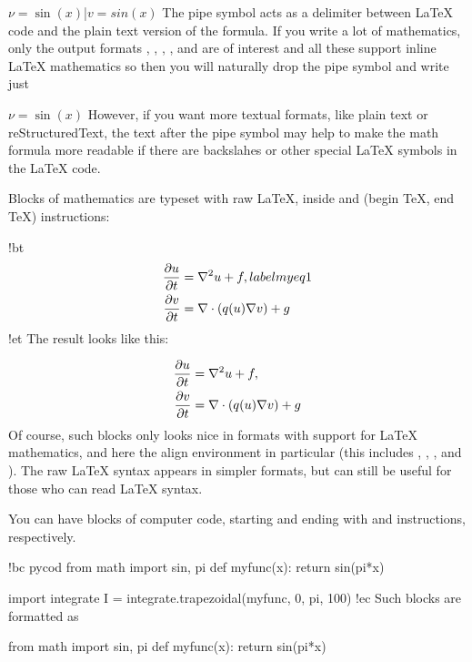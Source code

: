 \documentclass[%
oneside,                 %
final,                   %
10pt]{article}
\begin{document}
\bccq
$\nu = \sin(x)$|$v = sin(x)$
\eccq
The pipe symbol acts as a delimiter between {\LaTeX} code and the plain text
version of the formula. If you write a lot of mathematics, only the
output formats , , , , and 
are of interest
and all these support inline {\LaTeX} mathematics so then you will naturally
drop the pipe symbol and write just

\bccq
$\nu = \sin(x)$
\eccq
However, if you want more textual formats, like plain text or reStructuredText,
the text after the pipe symbol may help to make the math formula more readable
if there are backslahes or other special {\LaTeX} symbols in the {\LaTeX} code.

Blocks of mathematics are typeset with raw {\LaTeX}, inside
 and  (begin TeX, end TeX) instructions:

\bccq
!bt
\begin{align}
{\partial u\over\partial t} &= \nabla^2 u + f, label{myeq1}\\ 
{\partial v\over\partial t} &= \nabla\cdot(q(u)\nabla v) + g
\end{align}
!et
\eccq
The result looks like this:

\begin{align}
{\partial u\over\partial t} &= \nabla^2 u + f, \label{myeq1}\\ 
{\partial v\over\partial t} &= \nabla\cdot(q(u)\nabla v) + g
\end{align}
Of course, such blocks only looks nice in formats with support
for {\LaTeX} mathematics, and here the align environment in particular
(this includes , , , and ). The raw
{\LaTeX} syntax appears in simpler formats, but can still be useful
for those who can read {\LaTeX} syntax.

You can have blocks of computer code, starting and ending with
 and  instructions, respectively.

\bccq
!bc pycod
from math import sin, pi
def myfunc(x):
    return sin(pi*x)

import integrate
I = integrate.trapezoidal(myfunc, 0, pi, 100)
!ec
\eccq
Such blocks are formatted as

\bpycod
from math import sin, pi
def myfunc(x):
    return sin(pi*x)
\end{document}

